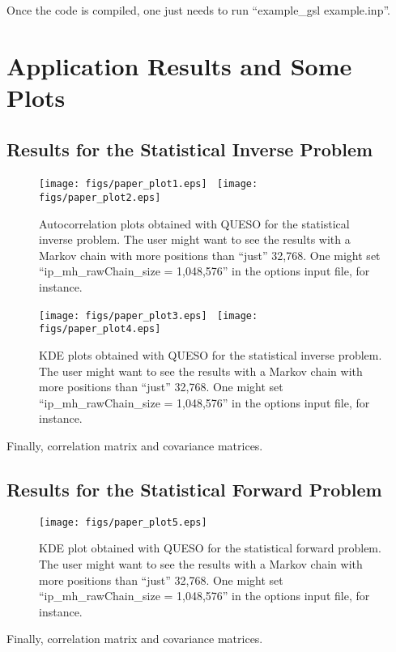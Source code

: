 Once the code is compiled, one just needs to run ``example\_gsl example.inp''.

\clearpage
\section{Application Results and Some Plots}\label{sc-appl-plots}

\subsection{Results for the Statistical Inverse Problem}

\begin{figure}[h!]
\centerline{
\texttt{[image: figs/paper\_plot1.eps]}
$~$
\texttt{[image: figs/paper\_plot2.eps]}
}
\caption{
Autocorrelation plots obtained with QUESO for the statistical inverse problem.
The user might want to see the results with a Markov chain with more positions than ``just'' 32,768. One might set ``ip\_mh\_rawChain\_size = 1,048,576'' in the options input file, for instance.
}
\label{fig-sip-autocorr-plots}
\end{figure}

\begin{figure}[h!]
\centerline{
\texttt{[image: figs/paper\_plot3.eps]}
$~$
\texttt{[image: figs/paper\_plot4.eps]}
}
\caption{
KDE plots obtained with QUESO for the statistical inverse problem.
The user might want to see the results with a Markov chain with more positions than ``just'' 32,768. One might set ``ip\_mh\_rawChain\_size = 1,048,576'' in the options input file, for instance.
}
\label{fig-sip-hist-kde-plots}
\end{figure}

Finally, correlation matrix and covariance matrices.

\clearpage

\subsection{Results for the Statistical Forward Problem}

\begin{figure}[h!]
\centerline{
\texttt{[image: figs/paper\_plot5.eps]}
}
\caption{
KDE plot obtained with QUESO for the statistical forward problem.
The user might want to see the results with a Markov chain with more positions than ``just'' 32,768. One might set ``ip\_mh\_rawChain\_size = 1,048,576'' in the options input file, for instance.
}
\label{fig-sfp-hist-kde-plots}
\end{figure}

Finally, correlation matrix and covariance matrices.

